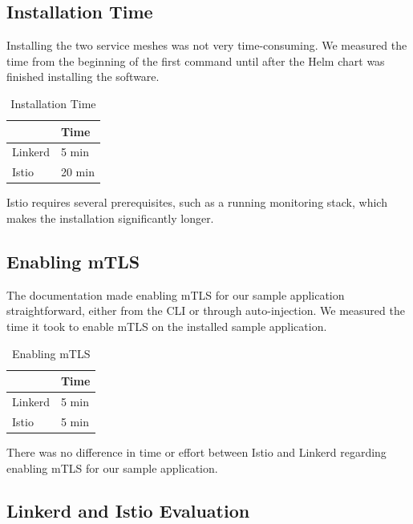 \subsection{Installation Time}

Installing the two service meshes was not very time-consuming. We measured the time from the beginning of the first command until after the Helm chart was finished installing the software.

\begin{table}[ht]
  \caption{Installation Time}
    \begin{tabular}{| l | l |}
    \hline
    & Time \\
    \hline\hline
    Linkerd & 5 min \\
    \hline
    Istio & 20 min \\
    \hline
    \hline
    \end{tabular}
  \label{tab:installTime}
\end{table}

Istio requires several prerequisites, such as a running monitoring stack, which makes the installation significantly longer.

\subsection{Enabling mTLS}

The documentation made enabling mTLS for our sample application straightforward, either from the CLI or through auto-injection. We measured the time it took to enable mTLS on the installed sample application.

\begin{table}[ht]
  \caption{Enabling mTLS}
    \begin{tabular}{| l | l |}
    \hline
    & Time \\
    \hline\hline
    Linkerd & 5 min \\
    \hline
    Istio & 5 min \\
    \hline
    \hline
    \end{tabular}
  \label{tab:enableTime}
\end{table}

There was no difference in time or effort between Istio and Linkerd regarding enabling mTLS for our sample application.

\subsection{Linkerd and Istio Evaluation}

